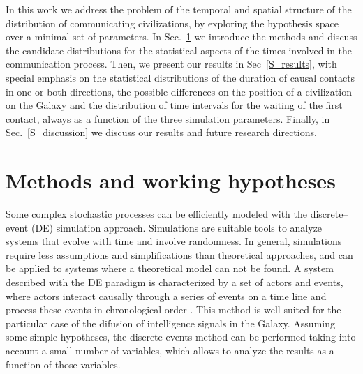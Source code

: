\documentclass[crop]{CSLB}%
\begin{document}
In this work we address the problem of the temporal and spatial
structure of the distribution of communicating civilizations, by
exploring the hypothesis space over a minimal set of parameters.
%
In Sec.~\ref{S_methods} we introduce the methods and discuss the
candidate distributions for the statistical aspects of the times
involved in the communication process.
%
Then, we present our results in Sec~\ref{S_results}, with special
emphasis on the statistical distributions of the duration of causal
contacts in one or both directions, the possible differences on the
position of a civilization on the Galaxy and the distribution of time
intervals for the waiting of the first contact, always as a function
of the three simulation parameters.
%
Finally, in Sec.~\ref{S_discussion} we discuss our results and future
research directions.



\section{Methods and working hypotheses}\label{S_methods}

Some complex stochastic processes can be efficiently modeled with the
discrete--event (DE) simulation approach.
%
Simulations are suitable tools to analyze systems that evolve with
time and involve randomness.
%
In general, simulations require less assumptions and simplifications
than theoretical approaches, and can be applied to systems where a
theoretical model can not be found.
%
A system described with the DE paradigm is characterized by a set of
actors and events, where actors interact causally through a series of
events on a time line and process these events in chronological order
\citep{ptolemaeus_system_2014, chung_simulation_2003,
simulation_ross_2012}.
%
This method is well suited for the particular case of the difusion of
intelligence signals in the Galaxy.
%
Assuming some simple hypotheses, the discrete events method can be
performed taking into account a small number of variables, which
allows to analyze the results as a function of those variables.
\end{document}
